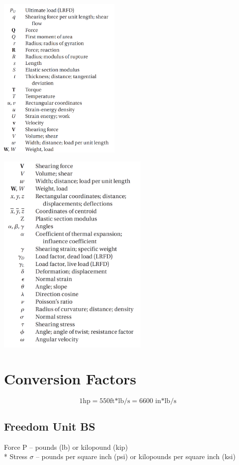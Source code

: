 \documentclass[10pt,landscape]{article}
\newenvironment{Figure}
     {\par\medskip\noindent\minipage{\linewidth}}
     {\endminipage\par\medskip}
\begin{document}
\begin{multicols}{3}
\begin{Figure}
\end{Figure}
\begin{Figure}
    \centering
    \includegraphics[width=\linewidth, height=8cm]{ListOfSymbols_Part_3.png}
\end{Figure}
\begin{Figure}
    \centering
    \includegraphics[width=\linewidth, height=10cm]{ListOfSymbols_Part_4.png}
\end{Figure}

\section{Conversion Factors}
\begin{equation}
    1\text{hp}=550\text{ft*lb/s}=6600\text{ in*lb/s}
\end{equation}
\subsection{Freedom Unit BS}
Force P -- pounds (lb) or kilopound (kip)\\*
Stress $\sigma$ -- pounds per square inch (psi) or kilopounds per square inch (ksi) 


\end{multicols}
\end{document}
